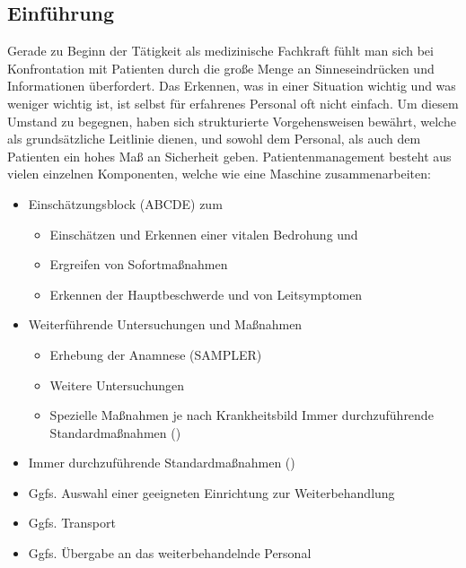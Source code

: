 \subsection{Einführung} 
Gerade zu Beginn der Tätigkeit als medizinische
Fachkraft fühlt man sich bei Konfrontation mit Patienten durch die
große Menge an Sinneseindrücken und Informationen überfordert. 
Das Erkennen, was in einer Situation wichtig und was weniger
wichtig ist, ist selbst für erfahrenes Personal oft nicht einfach.
Um diesem Umstand zu begegnen, haben sich strukturierte
Vorgehensweisen bewährt, welche als grundsätzliche Leitlinie
dienen, und sowohl dem Personal, als auch dem Patienten ein
hohes Maß an Sicherheit geben.
Patientenmanagement besteht aus vielen einzelnen
Komponenten, welche wie eine Maschine zusammenarbeiten:
\begin{itemize}
  \item Einschätzungsblock (ABCDE) zum
  \begin{itemize}
    \item Einschätzen und
    Erkennen einer vitalen Bedrohung und
    \item Ergreifen von Sofortmaßnahmen
    \item Erkennen der Hauptbeschwerde und von Leitsymptomen
  \end{itemize}
  \item Weiterführende Untersuchungen und Maßnahmen
  \begin{itemize}
    \item Erhebung der Anamnese (SAMPLER)
    \item Weitere Untersuchungen
    \item Spezielle Maßnahmen je nach Krankheitsbild
    Immer durchzuführende Standardmaßnahmen
    ()
  \end{itemize}
  \item Immer durchzuführende Standardmaßnahmen
  ()
  \item Ggfs. Auswahl einer geeigneten Einrichtung zur
  Weiterbehandlung
  \item Ggfs. Transport
  \item Ggfs. Übergabe an das weiterbehandelnde Personal
\end{itemize}








